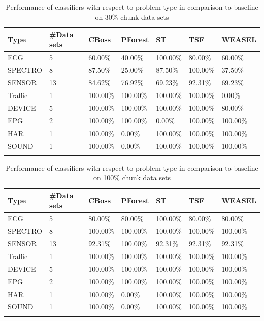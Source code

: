 \begin{table}[hp!]
	\setlength\extrarowheight{2pt} %
	\begin{tabularx}{\textwidth}{|X|X|X|X|X|X|X|}
	\hline
	\textbf{Type} & \textbf{\#Data sets} & \textbf{CBoss} & \textbf{PForest} & \textbf{ST} & \textbf{TSF} & \textbf{WEASEL} \\ \hline
		ECG & 5 & 60.00\% & 40.00\% & 100.00\% & 80.00\% & 60.00\% \\ \hline
		SPECTRO & 8 &87.50\% & 25.00\% & 87.50\% & 100.00\% & 37.50\% \\ \hline
		SENSOR & 13 & 84.62\% & 76.92\% & 69.23\% & 92.31\% & 69.23\% \\ \hline
		Traffic & 1 & 100.00\% & 100.00\% & 100.00\% & 100.00\% & 0.00\% \\ \hline
		DEVICE & 5 & 100.00\% & 100.00\% & 100.00\% & 100.00\% & 80.00\% \\ \hline
		EPG & 2 & 100.00\% & 100.00\% & 0.00\% & 100.00\% & 100.00\% \\ \hline
		HAR & 1 & 100.00\% & 0.00\% & 100.00\% & 100.00\% & 100.00\% \\ \hline
		SOUND & 1 & 100.00\% & 0.00\% & 100.00\% & 100.00\% & 100.00\% \\ \hline
  \caption{Performance of classifiers with respect to problem type in comparison to baseline on 30\% chunk data sets}
  \label{TableType30}
  \end{tabularx}
\end{table}

\begin{table}[hp!]
	\setlength\extrarowheight{2pt} %
	\begin{tabularx}{\textwidth}{|X|X|X|X|X|X|X|}
	\hline
	\textbf{Type} & \textbf{\#Data sets} & \textbf{CBoss} & \textbf{PForest} & \textbf{ST} & \textbf{TSF} & \textbf{WEASEL} \\ \hline
		ECG & 5 & 80.00\% & 80.00\% & 100.00\% & 80.00\% & 80.00\% \\ \hline
		SPECTRO & 8 &100.00\% & 100.00\% & 100.00\% & 100.00\% & 100.00\% \\ \hline
		SENSOR & 13 & 92.31\% & 100.00\% & 92.31\% & 92.31\% & 92.31\% \\ \hline
		Traffic & 1 & 100.00\% & 100.00\% & 100.00\% & 100.00\% & 100.00\% \\ \hline
		DEVICE & 5 & 100.00\% & 100.00\% & 100.00\% & 100.00\% & 100.00\% \\ \hline
		EPG & 2 & 100.00\% & 100.00\% & 100.00\% & 100.00\% & 100.00\% \\ \hline
		HAR & 1 & 100.00\% & 0.00\% & 100.00\% & 100.00\% & 100.00\% \\ \hline
		SOUND & 1 & 100.00\% & 0.00\% & 100.00\% & 100.00\% & 100.00\% \\ \hline
  \caption{Performance of classifiers with respect to problem type in comparison to baseline on 100\% chunk data sets}
  \label{TableType100}
  \end{tabularx}
\end{table}

